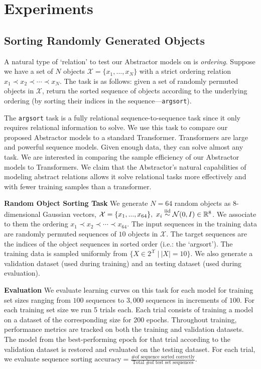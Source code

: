 \section{Experiments}
\label{sec:experiments}

\subsection{Sorting Randomly Generated Objects}
\label{ssec:random_object_argsort}

A natural type of `relation' to test our Abstractor models on is \textit{ordering}. Suppose we have a set of $N$ objects $\mathcal{X} = \{ x_1 , ..., x_N \}$ with a strict ordering relation $x_1 \prec x_2 \prec \cdots \prec x_N$. The task is as follows: given a set of randomly permuted objects in $\mathcal{X}$, return the sorted sequence of objects according to the underlying ordering (by sorting their indices in the sequence---\texttt{argsort}).

The \texttt{argsort} task is a fully relational sequence-to-sequence task since it only requires relational information to solve. We use this task to compare our proposed Abstractor models to a standard Transformer. Transformers are large and powerful sequence models. Given enough data, they can solve almost any task. We are interested in comparing the sample efficiency of our Abstractor models to Transformers. We claim that the Abstractor's natural capabilities of modeling abstract relations allows it solve relational tasks more effectively and with fewer training samples than a transformer.

\textbf{Random Object Sorting Task} We generate $N=64$ random objects as 8-dimensional Gaussian vectors, $\mathcal{X} = \{ x_1 , ..., x_{64} \}, \ x_i \overset{\mathrm{iid}}{\sim} \mathcal{N}(0, I) \in \mathbb{R}^8$. We associate to them the ordering $x_1 \prec x_2 \prec \cdots \prec x_{64}$. The input sequences in the training data are randomly permuted sequences of $10$ objects in $\mathcal{X}$. The target sequences are the indices of the object sequences in sorted order (i.e.: the `argsort'). The training data is sampled uniformly from $\{ X \in 2^\mathcal{X} \ \vert \ |X| = 10\}$. We also generate a validation dataset (used during training) and an testing dataset (used during evaluation).

\textbf{Evaluation} We evaluate learning curves on this task for each model for training set sizes ranging from $100$ sequences to $3,000$ sequences in increments of $100$. For each training set size we run 5 trials each. Each trial consists of training a model on a dataset of the corresponding size for 200 epochs. Throughout training, performance metrics are tracked on both the training and validation datasets. The model from the best-performing epoch for that trial according to the validation dataset is restored and evaluated on the testing dataset. For each trial, we evaluate $\text{sequence sorting accuracy} = \frac{\text{\# of sequence sorted correctly}}{\text{Total \# of test set sequences}}$.

